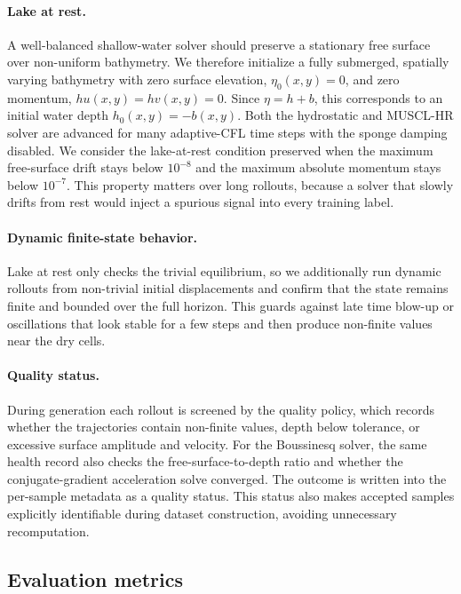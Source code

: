 \paragraph{Lake at rest.} A well-balanced shallow-water solver should preserve a stationary free surface over non-uniform bathymetry. We therefore initialize a fully submerged, spatially varying bathymetry with zero surface elevation, $\eta_0(x,y) = 0$, and zero momentum, $hu(x,y) = hv(x,y) = 0$. Since $\eta = h + b$, this corresponds to an initial water depth $h_0(x,y) = -b(x,y)$. Both the hydrostatic and MUSCL-HR solver are advanced for many adaptive-CFL time steps with the sponge damping disabled. We consider the lake-at-rest condition preserved when the maximum free-surface drift stays below $10^{-8}$ and the maximum absolute momentum stays below $10^{-7}$. This property matters over long rollouts, because a solver that slowly drifts from rest would inject a spurious signal into every training label.

\paragraph{Dynamic finite-state behavior.} Lake at rest only checks the trivial equilibrium, so we additionally run dynamic rollouts from non-trivial initial displacements and confirm that the state remains finite and bounded over the full horizon. This guards against late time blow-up or oscillations that look stable for a few steps and then produce non-finite values near the dry cells.

\paragraph{Quality status.} During generation each rollout is screened by the quality policy, which records whether the trajectories contain non-finite values, depth below tolerance, or excessive surface amplitude and velocity. For the Boussinesq solver, the same health record also checks the free-surface-to-depth ratio and whether the conjugate-gradient acceleration solve converged. The outcome is written into the per-sample metadata as a quality status. This status also makes accepted samples explicitly identifiable during dataset construction, avoiding unnecessary recomputation.

\subsection{Evaluation metrics}
\label{subsec:eval-metrics}

